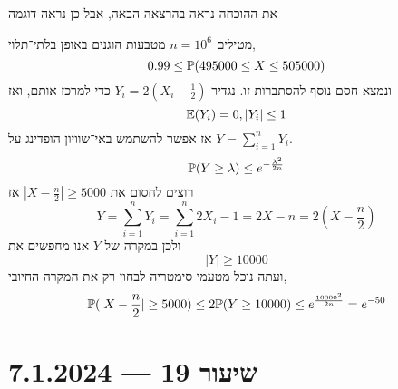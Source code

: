 את ההוכחה נראה בהרצאה הבאה, אבל כן נראה דוגמה
\begin{example}
	מטילים $n = 10^6$ מטבעות הוגנים באופן בלתי־תלוי,
	\[
		0.99 \le \mathbb{P}(495000 \le X \le 505000)
	\]
	ונמצא חסם נוסף להסתברות זו.
	נגדיר $Y_i = 2(X_i - \frac{1}{2})$ כדי למרכז אותם, ואז
	\[
		\mathbb{E}(Y_i) = 0,
		|Y_i| \le 1
	\]
	אז אפשר להשתמש באי־שוויון הופדינג על $Y = \sum_{i = 1}^{n} Y_i$.
	\[
		\mathbb{P}(Y \ge \lambda)
		\le e^{-\frac{\lambda^2}{2n}}
	\]
	רוצים לחסום את $|X - \frac{n}{2}| \ge 5000$ אז
	\[
		Y
		= \sum_{i = 1}^{n} Y_i
		= \sum_{i = 1}^{n} 2X_i - 1
		= 2X - n
		= 2 (X - \frac{n}{2})
	\]
	ולכן במקרה של $Y$ אנו מחפשים את
	\[
		|Y| \ge 10000
	\]
	ועתה נוכל מטעמי סימטריה לבחון רק את המקרה החיובי,
	\[
		\mathbb{P}(|X - \frac{n}{2}| \ge 5000)
		\le 2 \mathbb{P}(Y \ge 10000)
		\le e^{\frac{10000^2}{2n}}
		= e^{-50}
	\]
\end{example}

\section{שיעור 19 --- 7.1.2024}
